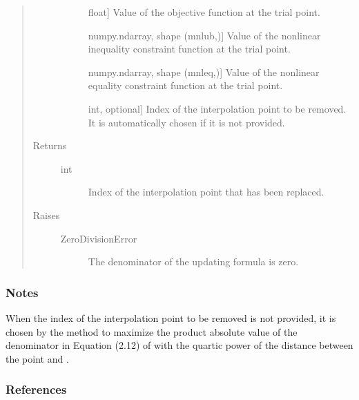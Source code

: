 \documentclass[letterpaper,10pt,english]{sphinxmanual}
\begin{document}
\begin{fulllineitems}
\begin{fulllineitems}
\begin{quote}
\begin{description}
\begin{description}
\item[{}] \leavevmode{[}float{]}
\sphinxAtStartPar
Value of the objective function at the trial point.

\item[{}] \leavevmode{[}numpy.ndarray, shape (mnlub,){]}
\sphinxAtStartPar
Value of the nonlinear inequality constraint function at the trial
point.

\item[{}] \leavevmode{[}numpy.ndarray, shape (mnleq,){]}
\sphinxAtStartPar
Value of the nonlinear equality constraint function at the trial
point.

\item[{}] \leavevmode{[}int, optional{]}
\sphinxAtStartPar
Index of the interpolation point to be removed. It is automatically
chosen if it is not provided.

\end{description}

\item[{Returns}] \leavevmode\begin{description}
\item[{int}] \leavevmode
\sphinxAtStartPar
Index of the interpolation point that has been replaced.

\end{description}

\item[{Raises}] \leavevmode\begin{description}
\item[{ZeroDivisionError}] \leavevmode
\sphinxAtStartPar
The denominator of the updating formula is zero.

\end{description}

\end{description}\end{quote}
\subsubsection*{Notes}

\sphinxAtStartPar
When the index  of the interpolation point to be removed is not
provided, it is chosen by the method to maximize the product absolute
value of the denominator in Equation (2.12) of  with the quartic
power of the distance between the point and .
\subsubsection*{References}

\sphinxAtStartPar
{}

\end{fulllineitems}


\end{fulllineitems}
\end{document}
